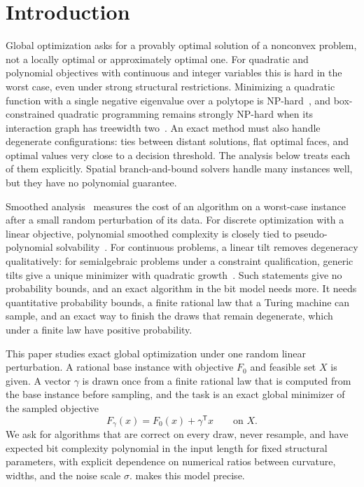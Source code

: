 \section{Introduction}\label{sec:intro}

Global optimization asks for a provably optimal solution of a nonconvex
problem, not a locally optimal or approximately optimal one. For quadratic
and polynomial objectives with continuous and integer variables this is hard
in the worst case, even under strong structural restrictions. Minimizing a
quadratic function with a single negative eigenvalue over a polytope is
NP-hard~\citep{pardalos1991-quadratic-programming-with-one}, and box-constrained quadratic
programming remains strongly NP-hard when its interaction graph has
treewidth two~\citep{pia2026-treewidth-and-the-complexity-of}. An exact
method must also handle degenerate configurations: ties between distant
solutions, flat optimal faces, and optimal values very close to a decision
threshold. The analysis below treats each of them explicitly. Spatial
branch-and-bound solvers handle many instances well, but they have no
polynomial guarantee.

Smoothed analysis~\citep{spielman2004-smoothed-analysis-of-algorithms-why} measures the cost of an algorithm
on a worst-case instance after a small random perturbation of its data. For
discrete optimization with a linear objective, polynomial smoothed
complexity is closely tied to pseudo-polynomial
solvability~\citep{beier2006-typical-properties-of-winners-and,roglin2007-smoothed-analysis-of-integer-programming}.
For continuous problems, a linear tilt removes degeneracy qualitatively: for
semialgebraic problems under a constraint qualification, generic tilts give
a unique minimizer with quadratic
growth~\citep{lee2017-generic-properties-for-semialgebraic-programs}. Such
statements give no probability bounds, and an exact algorithm in the bit
model needs more. It needs quantitative probability bounds, a finite rational law
that a Turing machine can sample, and an exact way to finish the draws that
remain degenerate, which under a finite law have positive probability.

This paper studies exact global optimization under one random linear
perturbation. A rational base instance with objective $F_0$ and feasible set
$X$ is given. A vector $\gamma$ is drawn once from a finite rational law that
is computed from the base instance before sampling, and the task is an exact
global minimizer of the sampled objective
\[
 F_\gamma(x)=F_0(x)+\gamma^{\mathsf T}x\qquad\text{on }X .
\]
We ask for algorithms that are correct on every draw, never resample, and
have expected bit complexity polynomial in the input length for fixed
structural parameters, with explicit dependence on numerical ratios between
curvature, widths, and the noise scale $\sigma$.  makes this
model precise.

